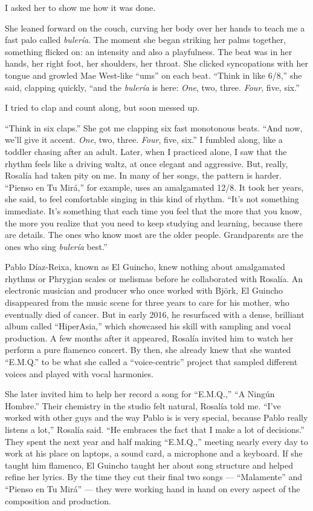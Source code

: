 I asked her to show me how it was done.

She leaned forward on the couch, curving her body over her hands to
teach me a fast palo called \emph{bulería}. The moment she began
striking her palms together, something flicked on: an intensity and also
a playfulness. The beat was in her hands, her right foot, her shoulders,
her throat. She clicked syncopations with her tongue and growled Mae
West-like ``ums'' on each beat. ``Think in like 6/8,'' she said,
clapping quickly, ``and the \emph{bulería} is here: \emph{One}, two,
three. \emph{Four}, five, six.''

I tried to clap and count along, but soon messed up.

``Think in six claps.'' She got me clapping six fast monotonous beats.
``And now, we'll give it accent. \emph{One}, two, three. \emph{Four},
five, six.'' I fumbled along, like a toddler chasing after an adult.
Later, when I practiced alone, I saw that the rhythm feels like a
driving waltz, at once elegant and aggressive. But, really, Rosalía had
taken pity on me. In many of her songs, the pattern is harder. ``Pienso
en Tu Mirá,'' for example, uses an amalgamated 12/8. It took her years,
she said, to feel comfortable singing in this kind of rhythm. ``It's not
something immediate. It's something that each time you feel that the
more that you know, the more you realize that you need to keep studying
and learning, because there are details. The ones who know most are the
older people. Grandparents are the ones who sing \emph{bulería} best.''

Pablo Díaz-Reixa, known as El Guincho, knew nothing about amalgamated
rhythms or Phrygian scales or melismas before he collaborated with
Rosalía. An electronic musician and producer who once worked with Björk,
El Guincho disappeared from the music scene for three years to care for
his mother, who eventually died of cancer. But in early 2016, he
resurfaced with a dense, brilliant album called ``HiperAsia,'' which
showcased his skill with sampling and vocal production. A few months
after it appeared, Rosalía invited him to watch her perform a pure
flamenco concert. By then, she already knew that she wanted ``E.M.Q.''
to be what she called a ``voice-centric'' project that sampled different
voices and played with vocal harmonies.

She later invited him to help her record a song for ``E.M.Q.,'' ``A
Ningún Hombre.'' Their chemistry in the studio felt natural, Rosalía
told me. ``I've worked with other guys and the way Pablo is is very
special, because Pablo really listens a lot,'' Rosalía said. ``He
embraces the fact that I make a lot of decisions.'' They spent the next
year and half making ``E.M.Q.,'' meeting nearly every day to work at his
place on laptops, a sound card, a microphone and a keyboard. If she
taught him flamenco, El Guincho taught her about song structure and
helped refine her lyrics. By the time they cut their final two songs ---
``Malamente'' and ``Pienso en Tu Mirá'' --- they were working hand in
hand on every aspect of the composition and production.

